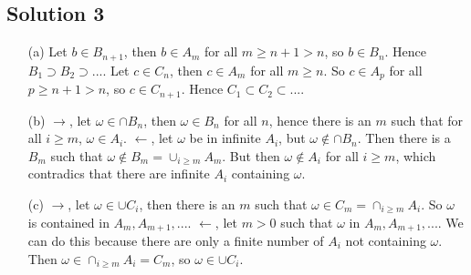 \subsection*{Solution 3}

\begin{itemize}
    \item[(a)] Let $b \in B_{n+1}$, then $b \in A_m$ for all $m \geq n + 1 > n$, so $b \in B_n$.
        Hence $B_1 \supset B_2 \supset ...$.
        Let $c \in C_n$, then $c \in A_m$ for all $m \geq n$.
        So $c \in A_p$ for all $p \geq n + 1 > n$, so $c \in C_{n+1}$.
        Hence $C_1 \subset C_2 \subset ...$.
    \item[(b)] $\rightarrow$, let $\omega \in \cap B_n$, then $\omega \in B_n$ for all $n$, hence there is an $m$ such that for all $i \geq m$, $\omega \in A_i$.
        $\leftarrow$, let $\omega$ be in infinite $A_i$, but $\omega \notin \cap B_n$.
        Then there is a $B_m$ such that $\omega \notin B_m = \cup_{i \geq m} A_m$.
        But then $\omega \notin A_i$ for all $i \geq m$, which contradics that there are infinite $A_i$ containing $\omega$.
    \item[(c)] $\rightarrow$, let $\omega \in \cup C_i$, then there is an $m$ such that $\omega \in C_m = \cap_{i \geq m} A_i$.
        So $\omega$ is contained in $A_m, A_{m+1}, ...$.
        $\leftarrow$, let $m > 0$ such that $\omega$ in $A_m, A_{m+1}, ...$.
        We can do this because there are only a finite number of $A_i$ not containing $\omega$.
        Then $\omega \in \cap_{i \geq m} A_i = C_m$, so $\omega \in \cup C_i$.

\end{itemize}
